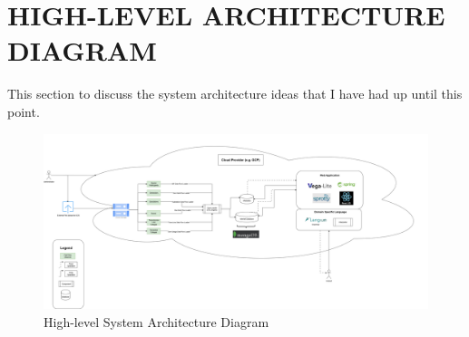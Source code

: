 
\chapter{\uppercase {High-Level Architecture Diagram}}\label{appendix:F}

This section to discuss the system architecture ideas that I have had up until this point.


\begin{landscape}
  \begin{figure}[h!tbp]
    \centering
    \includegraphics[width=\linewidth, height=\textheight, keepaspectratio]{graphic/2025_08_22_grasby_architecture_plan.drawio.png}
    \caption{High-level System Architecture Diagram}
  \end{figure}
\end{landscape}
\restoregeometry
\clearpage %

